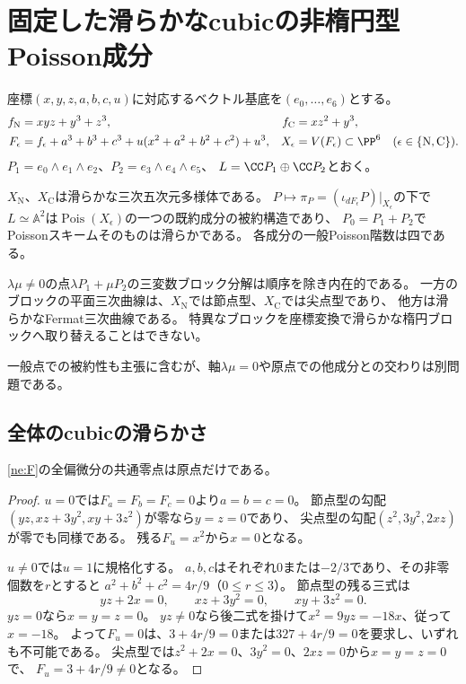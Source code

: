 \section{固定した滑らかなcubicの非楕円型Poisson成分}\label{ne:examples}
座標$(x,y,z,a,b,c,u)$に対応するベクトル基底を$(e_0,\ldots,e_6)$とする。
\begin{equation}\label{ne:F}
\begin{aligned}
 f_{\mathrm N}&=xyz+y^3+z^3,& f_{\mathrm C}&=xz^2+y^3,\\
 F_\epsilon&=f_\epsilon+a^3+b^3+c^3+u(x^2+a^2+b^2+c^2)+u^3,
 &X_\epsilon&=V(F_\epsilon)\subset\PP^6
 \quad(\epsilon\in\{\mathrm N,\mathrm C\}).
\end{aligned}
\end{equation}
$P_1=e_0\wedge e_1\wedge e_2$、$P_2=e_3\wedge e_4\wedge e_5$、
$L=\CC P_1\oplus\CC P_2$とおく。

\begin{theorem}[非楕円型を一般点に持つ既約成分]\label{ne:main}
$X_{\mathrm N}$、$X_{\mathrm C}$は滑らかな三次五次元多様体である。
$P\mapsto\pi_P=(\iota_{dF_\epsilon}P)|_{X_\epsilon}$の下で
$L\simeq\mathbb A^2$は$\operatorname{Pois}(X_\epsilon)$の一つの既約成分の被約構造であり、
$P_0=P_1+P_2$でPoissonスキームそのものは滑らかである。
各成分の一般Poisson階数は四である。

$\lambda\mu\ne0$の点$\lambda P_1+\mu P_2$の三変数ブロック分解は順序を除き内在的である。
一方のブロックの平面三次曲線は、$X_{\mathrm N}$では節点型、$X_{\mathrm C}$では尖点型であり、
他方は滑らかなFermat三次曲線である。
特異なブロックを座標変換で滑らかな楕円ブロックへ取り替えることはできない。
\end{theorem}
一般点での被約性も主張に含むが、軸$\lambda\mu=0$や原点での他成分との交わりは別問題である。

\subsection{全体のcubicの滑らかさ}
\begin{lemma}\label{ne:smooth}
\eqref{ne:F}の全偏微分の共通零点は原点だけである。
\end{lemma}
\begin{proof}
$u=0$では$F_a=F_b=F_c=0$より$a=b=c=0$。
節点型の勾配$(yz,xz+3y^2,xy+3z^2)$が零なら$y=z=0$であり、
尖点型の勾配$(z^2,3y^2,2xz)$が零でも同様である。
残る$F_u=x^2$から$x=0$となる。

$u\ne0$では$u=1$に規格化する。
$a,b,c$はそれぞれ$0$または$-2/3$であり、その非零個数を$r$とすると
$a^2+b^2+c^2=4r/9$（$0\le r\le3$）。
節点型の残る三式は
\[
 yz+2x=0,\qquad xz+3y^2=0,\qquad xy+3z^2=0.
\]
$yz=0$なら$x=y=z=0$。
$yz\ne0$なら後二式を掛けて$x^2=9yz=-18x$、従って$x=-18$。
よって$F_u=0$は、$3+4r/9=0$または$327+4r/9=0$を要求し、いずれも不可能である。
尖点型では$z^2+2x=0$、$3y^2=0$、$2xz=0$から$x=y=z=0$で、
$F_u=3+4r/9\ne0$となる。
\end{proof}

